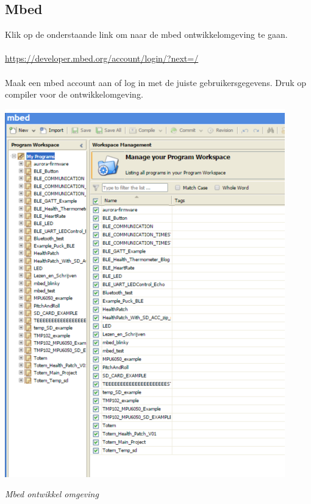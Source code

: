 \documentclass[conference]{IEEEtran}
\begin{document}
\subsection{Mbed}
Klik op de onderstaande link om naar de mbed ontwikkelomgeving te gaan.\\\\\url{https://developer.mbed.org/account/login/?next=/}\\\\Maak een mbed account aan of log in met de juiste gebruikersgegevens. Druk op compiler voor de ontwikkelomgeving.
 
\begin{center}
    \includegraphics[scale=.8]{mbed1}
    \begin{minipage}{0.6\textwidth}
    \footnotesize
    \emph{Mbed ontwikkel omgeving}
    \end{minipage}
\end{center}
\end{document}
